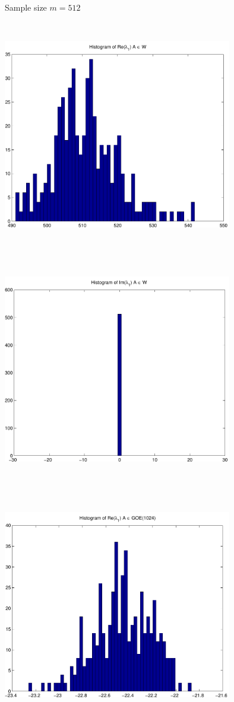 \documentclass[9pt]{article}
\theoremstyle{plain}
\theoremstyle{definition}
\theoremstyle{remark}
\numberwithin{equation}{section}
\begin{document}
Sample size $m = 512$

\includegraphics[width=10.0cm,height=10.0cm]{Re_TraceyWidom.pdf}

\includegraphics[width=10.0cm,height=10.0cm]{Im_TraceyWidom.pdf}

\includegraphics[width=10.0cm,height=10.0cm]{Re_Winger.pdf}
\end{document}
